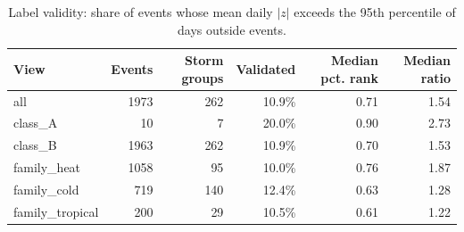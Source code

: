 \begin{table}[t]
\centering
\small
\begin{tabular}{lrrrrr}
\toprule
View & Events & Storm groups & Validated & Median pct. rank & Median ratio \\
\midrule
all & 1973 & 262 & 10.9\% & 0.71 & 1.54 \\
class\_A & 10 & 7 & 20.0\% & 0.90 & 2.73 \\
class\_B & 1963 & 262 & 10.9\% & 0.70 & 1.53 \\
family\_heat & 1058 & 95 & 10.0\% & 0.76 & 1.87 \\
family\_cold & 719 & 140 & 12.4\% & 0.63 & 1.28 \\
family\_tropical & 200 & 29 & 10.5\% & 0.61 & 1.22 \\
\bottomrule
\end{tabular}
\caption{Label validity: share of events whose mean daily $|z|$ exceeds the 95th percentile of days outside events.}
\label{tab:step10-validity}
\end{table}